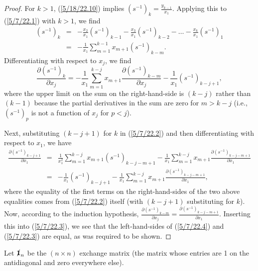 \documentclass{amsart}
\numberwithin{equation}{section}
\theoremstyle{definition}
\numberwithin{theorem}{section}
\begin{document}
\begin{proof}
 \noindent For $k>1$, (\ref{5/18/22.10}) implies  $\left( s^{-1} \right)_k = \frac{y_{k-1}}{x_1}$.  Applying this to (\ref{5/7/22.1}) with $k>1$, we find
\begin{eqnarray} \nonumber \left( s^{-1} \right)_k &=& -\frac{x_2}{x_1}\left( s^{-1} \right)_{k-1} - \frac{x_3}{x_1}\left( s^{-1} \right)_{k-2} -\dots  - \frac{x_k}{x_1}\left( s^{-1} \right)_1 \\ &=& -\frac{1}{x_1}\sum_{m=1}^{k-1} x_{m+1}\left( s^{-1} \right)_{k-m}. \label{5/7/22.2}\end{eqnarray}
Differentiating with respect to $x_j$, we find \begin{equation}  \frac{\partial \left( s^{-1} \right)_k}{\partial x_j} = -\frac{1}{x_1} \sum_{m=1}^{k-j} x_{m+1} \frac{\partial \left( s^{-1} \right)_{k-m}}{\partial x_j} -  \frac{1}{x_1}\left( s^{-1} \right)_{k-j+1} \label{5/7/22.4}, \end{equation} where the upper limit on the sum on the right-hand-side is $(k-j)$ rather than $(k-1)$ because the partial derivatives in the sum are zero for $m> k-j$ (i.e., $\left( s^{-1} \right)_p$ is not a function of $x_j$ for $p<j$).  

Next, substituting $(k-j+1)$ for $k$ in (\ref{5/7/22.2}) and then differentiating with respect to $x_1$, we have   \begin{eqnarray} \nonumber
 \frac{\partial \left( s^{-1} \right)_{k-j+1}}{\partial x_1} &=& \frac{1}{x_1^2} \sum_{m=1}^{k-j} x_{m+1} \left( s^{-1} \right)_{k-j-m+1}    - \frac{1}{x_1} \sum_{m=1}^{k-j} x_{m+1} \frac{\partial \left( s^{-1} \right)_{k-j-m+1}}{\partial x_1}  \\ &=& - \frac{1}{x_1}\left( s^{-1} \right)_{k-j+1}  -  \frac{1}{x_1} \sum_{m=1}^{k-j} x_{m+1} \frac{\partial \left( s^{-1} \right)_{k-j-m+1}}{\partial x_1},\label{5/7/22.3}\end{eqnarray} where the equality of the first terms on the right-hand-sides of the two above equalities comes from (\ref{5/7/22.2}) itself (with $(k-j+1)$ substituting for $k$). 
 Now, according to the induction hypothesis, $\frac{\partial \left( s^{-1} \right)_{k-m}}{\partial x_j} = \frac{\partial \left( s^{-1} \right)_{k-j-m+1}}{\partial x_1}$.  Inserting this into (\ref{5/7/22.3}), we see that the left-hand-sides of (\ref{5/7/22.4}) and (\ref{5/7/22.3}) are equal, as was required to be shown.
 \end{proof} 

Let $\slashed{\bf 1}_n$ be the $(n\times n)$ exchange matrix (the matrix whose entries are 1 on the antidiagonal and zero everywhere else).
\end{document}
